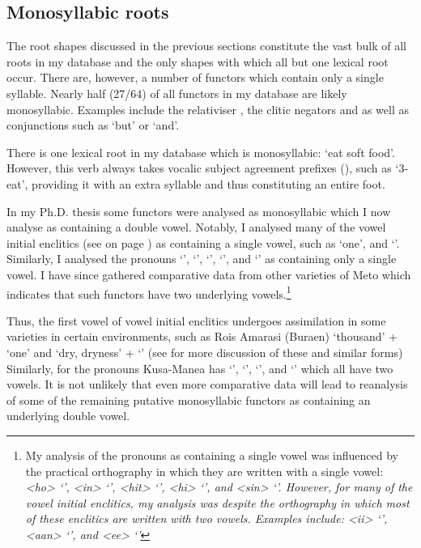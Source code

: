 \subsection{Monosyllabic roots}\label{sec:SinSylRoo}
The root shapes discussed in the previous sections
constitute the vast bulk of all roots in my database
and the only shapes with which all but one lexical root occur.
There are, however, a number of functors which
contain only a single syllable.
Nearly half (27/64) of all functors in my database are likely monosyllabic.
Examples include the relativiser ,
the clitic negators  and 
as well as conjunctions such as  `but' or  `and'.

There is one lexical root in my database
which is monosyllabic:  `eat soft food'.
However, this verb always takes vocalic subject agreement prefixes (),
such as  `3-eat', providing it with an extra
syllable and thus constituting an entire foot.

In my Ph.D. thesis \citep{ed16b}
some functors were analysed as monosyllabic
which I now analyse as containing a double vowel.
Notably, I analysed many of the vowel initial enclitics
(see  on page \pageref{tab2:AmaVowIniEnc})
as containing a single vowel, such as  `one', and  `{\ii}'.
Similarly, I analysed the pronouns  `{\hoo}',  `{\iin}',
 `{\hiit}',  `{\hii}', and  `{\siin}' as containing only a single vowel.
I have since gathered comparative data from other varieties
of Meto which indicates that such functors have two underlying vowels.\footnote{
		My analysis of the pronouns as containing a single vowel
		was influenced by the practical orthography in which they are written with a single vowel:
		 \it{<ho>} `{\hoo}',  \it{<in>} `{\iin}',  \it{<hit>} `{\hiit}',
		 \it{<hi>} `{\hii}', and  \it{<sin>} `{\siin}'.
		However, for many of the vowel initial enclitics, my analysis was \emph{despite}
		the orthography in which most of these enclitics are written with two vowels.
		Examples include:  \it{<ii>} `{\ii}', 
		\it{<aan>} `{\aan}', and  \it{<ee>} `{\ee}'}

Thus, the first vowel of vowel initial enclitics undergoes
assimilation in some varieties in certain environments,
such as Ro{\Q}is Amarasi (Buraen)  `thousand' +  `one' {\ra} 
and  `dry, dryness' +  `{\ii}' {\ra} 
(see  for more discussion of these and similar forms)
Similarly, for the pronouns Kusa-Manea has  `{\iin}',  `{\hiit}',
 `{\hii}', and  `{\siin}' which all have two vowels.
It is not unlikely that even more comparative data will lead to
reanalysis of some of the remaining putative monosyllabic functors
as containing an underlying double vowel.